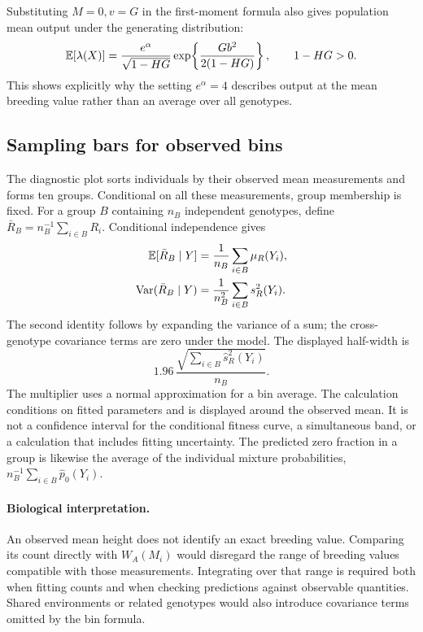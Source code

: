 Substituting \(M=0,v=G\) in the first-moment formula also gives population mean
output under the generating distribution:
\[
 \mathbb E[\lambda(X)]
 =\frac{e^\alpha}{\sqrt{1-HG}}
   \exp\!\left\{\frac{Gb^2}{2(1-HG)}\right\},
 \qquad 1-HG>0.
\]
This shows explicitly why the setting \(e^\alpha=4\) describes output at the
mean breeding value rather than an average over all genotypes.

\subsection{Sampling bars for observed bins}
\label{estimation:bin_variance}

The diagnostic plot sorts individuals by their observed mean measurements and
forms ten groups. Conditional on all these measurements, group membership is
fixed. For a group \(B\) containing \(n_B\) independent genotypes, define
\(\bar R_B=n_B^{-1}\sum_{i\in B}R_i\). Conditional independence gives
\begin{align}
 \mathbb E[\bar R_B\mid Y]
 &=\frac1{n_B}\sum_{i\in B}\mu_R(Y_i),\nonumber\\
 \operatorname{Var}(\bar R_B\mid Y)
 &=\frac1{n_B^2}\sum_{i\in B}s_R^2(Y_i).
 \label{estimation:bin_prediction}
\end{align}
The second identity follows by expanding the variance of a sum; the
cross-genotype covariance terms are zero under the model. The displayed
half-width is
\[
 1.96\,\frac{\sqrt{\sum_{i\in B}\widehat s_R^2(Y_i)}}{n_B}.
\]
The multiplier uses a normal approximation for a bin average. The calculation
conditions on fitted parameters and is displayed around the observed mean.
It is not a confidence interval for the conditional fitness curve, a
simultaneous band, or a calculation that includes fitting uncertainty. The
predicted zero fraction in a group is likewise the average of the individual
mixture probabilities, \(n_B^{-1}\sum_{i\in B}\widehat p_0(Y_i)\).

\paragraph{Biological interpretation.}
An observed mean height does not identify an exact breeding value. Comparing
its count directly with \(W_A(M_i)\) would disregard the range of breeding
values compatible with those measurements. Integrating over that range is
required both when fitting counts and when checking predictions against
observable quantities. Shared environments or related genotypes would also
introduce covariance terms omitted by the bin formula.

